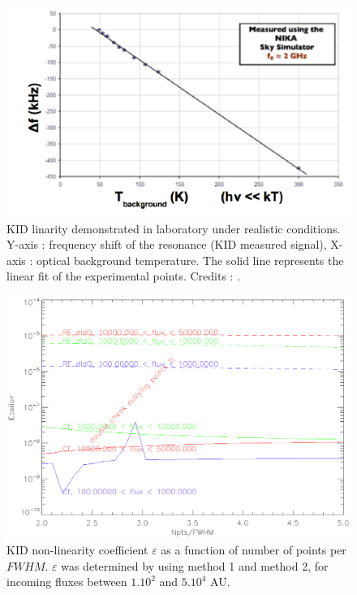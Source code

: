 \begin{figure}[h]
\center
	\includegraphics[scale=0.5]{Figures/KID-linearity-Monfardini2014.png}
	\caption{KID linarity demonstrated in laboratory under realistic conditions. Y-axis : frequency shift of the resonance (KID measured signal), X-axis : optical background temperature. The solid line represents the linear fit of the experimental points. Credits : \citet{2014JLTP..176..787M}.}
	\label{KID-lin}
\end{figure}

\begin{figure}[h]
	\includegraphics[scale=0.53]{Figures/epsilon.eps}
	\caption{KID non-linearity coefficient $\varepsilon$ as a function of number of points per $FWHM$. $\varepsilon$ was determined by using method 1 and method 2, for incoming fluxes between $1.10^{2}$ and $5.10^{4}$ AU.}
	\label{results_epsilon}
\end{figure}

